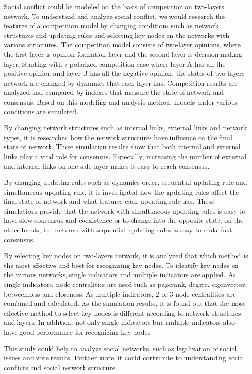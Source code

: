 

\begin{englishabstract}
Social conflict could be modeled on the basis of competition on two-layers network. To understand and analyze social conflict, we would research the features of a competition model by changing conditions such as network structures and updating rules and selecting key nodes on the networks with various structures. The competition model consists of two-layer opinions, where the first layer is opinion formation layer and the second layer is decision making layer. Starting with a polarized competition case where layer A has all the positive opinion and layer B has all the negative opinion, the states of two-layers network are changed by dynamics that each layer has. Competition results are analyzed and compared by indexes that measure the state of network and consensus. Based on this modeling and analysis method, models under various conditions are simulated.  

By changing network structures such as internal links, external links and network types, it is researched how the network structures have influence on the final state of network. These simulation results show that both internal and external links play a vital role for consensus. Especially, increasing the number of external and internal links on one side layer makes it easy to reach consensus.

By changing updating rules such as dynamics order, sequential updating rule and simultaneous updating rule, it is investigated how the updating rules affect the final state of network and what features each updating rule has. These simulations provide that the network with simultaneous updating rules is easy to have slow consensus and coexistence or to change into the opposite state, on the other hands, the network with sequential updating rules is easy to make fast consensus.

By selecting key nodes on two-layers network, it is analyzed that which method is the most effective and best for recognizing key nodes. To identify key nodes on the various networks, single indicators and multiple indicators are applied. As single indicators, node centralities are used such as pagerank, degree, eigenvector, betweenness and closeness. As multiple indicators, $2$ or $3$ node centralities are combined and calculated. As the simulation results, it is found out that the most effective method to select key nodes is different according to network structures and layers. In addition, not only single indicators but multiple indicators also have good performance for recognizing key nodes.

This study could help to analyze social networks, such as legalization of social issues and vote results. Further more, it could contribute to understanding social conflicts and social network structure.\\ \\

\end{englishabstract}

